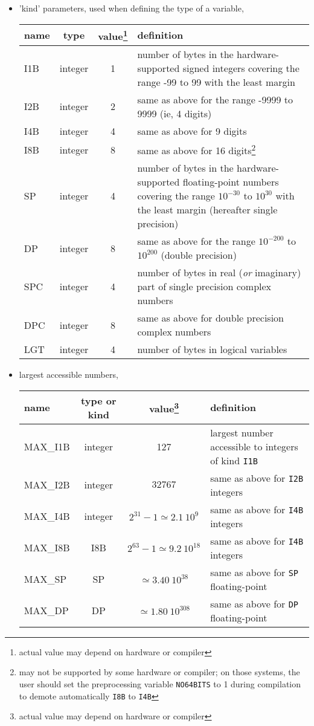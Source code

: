 \begin{itemize}
\item
'kind' parameters, used when defining the type of a variable,

\begin{mytable}{%
\begin{tabularx}{\linewidth}{lcc X}
name & type & value\footnote{actual value may depend on hardware or compiler} & definition \\
\hline
I1B & integer & 1 & number of bytes in the hardware-supported signed integers covering the range -99 to
99 with the least margin\\
I2B & integer & 2 & same as above for the range -9999 to 9999 (ie, 4 digits)\\
I4B & integer & 4 & same as above for 9 digits \\
I8B & integer & 8 & same as above for 16 digits\footnote{may not be supported by
  some hardware or compiler; on those systems, the user should set the
preprocessing variable {\tt NO64BITS} to 1 during compilation to demote
automatically {\tt I8B} to {\tt I4B}} \\
SP & integer & 4 & number of bytes in the hardware-supported floating-point
numbers covering the range $10^{-30}$ to $10^{30}$ with the least margin
(hereafter single precision)\\
DP & integer & 8 & same as above for the range $10^{-200}$ to $10^{200}$
(double precision)\\
SPC & integer & 4 & number of bytes in real ({\em or} imaginary) part of single precision complex numbers\\
DPC & integer & 8 & same as above for double precision complex numbers\\
LGT & integer & 4 & number of bytes in logical variables \\
\hline
\end{tabularx}
}%
\end{mytable}


\item
largest accessible numbers,

\begin{mytable}{%
\begin{tabularx}{\linewidth}{lcc X}
name & type or kind & value\footnote{actual value may depend on hardware or compiler} & definition \\
\hline
MAX\_I1B & integer & 127 & largest number accessible to integers of kind {\tt I1B}\\
MAX\_I2B & integer & $32767$ &
same as above for {\tt I2B} integers\\
MAX\_I4B & integer & $2^{31}-1 \simeq 2.1\ 10^9$& same as above for {\tt I4B} integers \\
MAX\_I8B & I8B & $2^{63}-1 \simeq 9.2\ 10^{18}$& same as above for {\tt I4B} integers \\
MAX\_SP & SP & $\simeq 3.40\ 10^{38}$ & same as above for {\tt SP} floating-point\\
MAX\_DP & DP & $\simeq 1.80\ 10^{308}$ & same as above for {\tt DP} floating-point\\
\hline
\end{tabularx}
}
\end{mytable}


\end{itemize}
